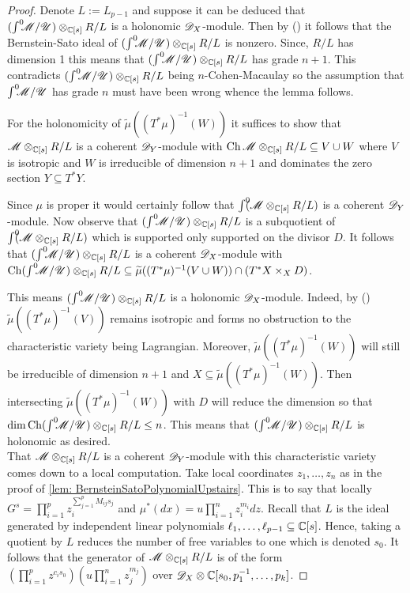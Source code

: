 \begin{proof}
  Denote $L := L_{p-1}$ and suppose it can be deduced that $(\int^0 \mkern -8mu\mathscr{M}/ \mathscr{U})\otimes_{\mathbb{C}[s]}R/L$ is a holonomic $\mathscr{D}_X$-module.
  Then by () it follows that the Bernstein-Sato ideal of $(\int^0 \mkern -8mu\mathscr{M}/ \mathscr{U})\otimes_{\mathbb{C}[s]}R/L$ is nonzero.
  Since, $R/L$ has dimension 1 this means that $(\int^0 \mkern -8mu\mathscr{M}/ \mathscr{U})\otimes_{\mathbb{C}[s]}R/L$ has grade $n+1$.
  This contradicts $(\int^0 \mkern -8mu\mathscr{M}/ \mathscr{U})\otimes_{\mathbb{C}[s]}R/L$ being $n$-Cohen-Macaulay so the assumption that $\int^0 \mkern -8mu\mathscr{M}/\mathscr{U}$ has grade $n$ must have been wrong whence the lemma follows.

  For the holonomicity of $\widetilde{\mu}((T^*\mu)^{-1}(W))$ it suffices to show that $\mathscr{M}\otimes_{\mathbb{C}[s]}R/L$ is a coherent $\mathscr{D}_Y$-module with $\operatorname{Ch}\mathscr{M}\otimes_{\mathbb{C}[s]}R/L \subseteq V\cup W $ where $V$ is isotropic and $W$ is irreducible of dimension $n+1$ and dominates the zero section $Y\subseteq T^* Y$.

  Since $\mu$ is proper it would certainly follow that $\int^0 \mkern -8mu(\mathscr{M} \otimes_{\mathbb{C}[s]} R/L)$ is a coherent $\mathscr{D}_Y$-module.
  Now observe that $(\int^0 \mkern -8mu\mathscr{M}/ \mathscr{U})\otimes_{\mathbb{C}[s]}R/L$ is a subquotient of $\int^0 \mkern -8mu (\mathscr{M} \otimes_{\mathbb{C}[s]} R/L)$ which is supported only supported on the divisor $D$.
  It follows that $(\int^0 \mkern -8mu\mathscr{M}/ \mathscr{U})\otimes_{\mathbb{C}[s]}R/L$ is a coherent $\mathscr{D}_X$-module with $\operatorname{Ch}(\int^0 \mkern -8mu\mathscr{M}/ \mathscr{U})\otimes_{\mathbb{C}[s]}R/L \subseteq \widetilde{\mu}((T^*\mu)^{-1}(V\cup W)) \cap (T^*X\times_X D)$.

  This means $(\int^0 \mkern -8mu\mathscr{M}/ \mathscr{U})\otimes_{\mathbb{C}[s]}R/L$ is a holonomic $\mathscr{D}_X$-module. Indeed, by () $\widetilde{\mu}((T^*\mu)^{-1}(V))$ remains isotropic and forms no obstruction to the characteristic variety being Lagrangian.
  Moreover, $\widetilde{\mu}((T^*\mu)^{-1}(W))$ will still be irreducible of dimension $n+1$ and $X\subseteq \widetilde{\mu}((T^*\mu)^{-1}(W))$.
  Then intersecting $\widetilde{\mu}((T^*\mu)^{-1}(W))$ with $D$ will reduce the dimension so that $\dim \operatorname{Ch} (\int^0 \mkern -8mu\mathscr{M}/ \mathscr{U})\otimes_{\mathbb{C}[s]}R/L \leq n$.
  This means that $(\int^0 \mkern -8mu\mathscr{M}/ \mathscr{U})\otimes_{\mathbb{C}[s]}R/L$ is holonomic as desired.\\


  That $\mathscr{M}\otimes_{\mathbb{C}[s]}R/L$ is a coherent $\mathscr{D}_Y$-module with this characteristic variety comes down to a local computation. Take local coordinates $z_1,\ldots,z_n$ as in the proof of \cref{lem: BernsteinSatoPolynomialUpstairs}.
  This is to say that locally $G^s = \prod_{i=1}^p z_i^{\sum_{j=1}^p M_{ij}s_j}$ and $\mu^*(dx) = u \prod_{i=1}^n z_i^{m_i} dz$.
  Recall that $L$ is the ideal generated by independent linear polynomials $\ell_1,\ldots,\ell_{p-1}\subseteq \mathbb{C}[s]$.
  Hence, taking a quotient by $L$ reduces the number of free variables to one which is denoted $s_0$.
  It follows that the generator of $\mathscr{M}\otimes_{\mathbb{C}[s]}R/L$ is of the form $(\prod_{i=1}^p z^{c_i s_0})(u\prod_{i=1}^nz_j^{m_j})$ over $\mathscr{D}_X\otimes\mathbb{C}[s_0,p_1^{-1},\ldots,p_k]$.


\end{proof}
\newpage
